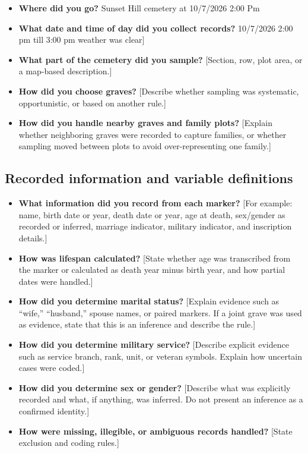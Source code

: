 \documentclass[
  10pt,
  twocolumn]{article}
\providecommand{\tightlist}{%
  \setlength{\itemsep}{0pt}\setlength{\parskip}{0pt}}
\begin{document}
\begin{itemize}
\tightlist
\item
  \textbf{Where did you go?} Sunset Hill cemetery at 10/7/2026 2:00 Pm
\item
  \textbf{What date and time of day did you collect records?} 10/7/2026
  2:00 pm till 3:00 pm weather was clear{]}
\item
  \textbf{What part of the cemetery did you sample?} {[}Section, row,
  plot area, or a map-based description.{]}
\item
  \textbf{How did you choose graves?} {[}Describe whether sampling was
  systematic, opportunistic, or based on another rule.{]}
\item
  \textbf{How did you handle nearby graves and family plots?} {[}Explain
  whether neighboring graves were recorded to capture families, or
  whether sampling moved between plots to avoid over-representing one
  family.{]}
\end{itemize}

\subsection{Recorded information and variable
definitions}\label{recorded-information-and-variable-definitions}

\begin{itemize}
\tightlist
\item
  \textbf{What information did you record from each marker?} {[}For
  example: name, birth date or year, death date or year, age at death,
  sex/gender as recorded or inferred, marriage indicator, military
  indicator, and inscription details.{]}
\item
  \textbf{How was lifespan calculated?} {[}State whether age was
  transcribed from the marker or calculated as death year minus birth
  year, and how partial dates were handled.{]}
\item
  \textbf{How did you determine marital status?} {[}Explain evidence
  such as ``wife,'' ``husband,'' spouse names, or paired markers. If a
  joint grave was used as evidence, state that this is an inference and
  describe the rule.{]}
\item
  \textbf{How did you determine military service?} {[}Describe explicit
  evidence such as service branch, rank, unit, or veteran symbols.
  Explain how uncertain cases were coded.{]}
\item
  \textbf{How did you determine sex or gender?} {[}Describe what was
  explicitly recorded and what, if anything, was inferred. Do not
  present an inference as a confirmed identity.{]}
\item
  \textbf{How were missing, illegible, or ambiguous records handled?}
  {[}State exclusion and coding rules.{]}
\end{itemize}
\end{document}
